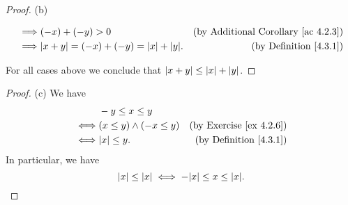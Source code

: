 \begin{proof}{(b)}
\begin{enumerate}[label=(\Roman*)]
\begin{enumerate}[label=(\roman*)]
\begin{align*}
                            \implies & (-x) + (-y) > 0                                   & \text{(by Additional Corollary \ref{ac 4.2.3})} \\
                            \implies & \abs*{x + y} = (-x) + (-y) = \abs*{x} + \abs*{y}. & \text{(by Definition \ref{4.3.1})}
                        \end{align*}
              \end{enumerate}
    \end{enumerate}
    For all cases above we conclude that \(\abs*{x + y} \leq \abs*{x} + \abs*{y}\).
\end{proof}

\begin{proof}{(c)}
    We have
    \begin{align*}
             & -y \leq x \leq y                                                   \\
        \iff & (x \leq y) \land (-x \leq y) & \text{(by Exercise \ref{ex 4.2.6})} \\
        \iff & \abs*{x} \leq y.             & \text{(by Definition \ref{4.3.1})}
    \end{align*}
    In particular, we have
    \[
        \abs*{x} \leq \abs*{x} \iff -\abs*{x} \leq x \leq \abs*{x}.
    \]
\end{proof}

